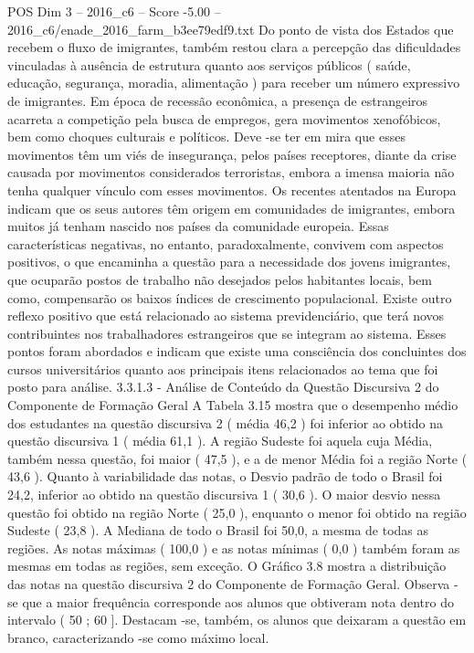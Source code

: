 \begin{textsample}{POS Dim 3 – 2016\_c6 – Score -5.00 – 2016\_c6/enade\_2016\_farm\_b3ee79edf9.txt}
Do ponto de vista dos Estados que recebem o fluxo de imigrantes, também restou clara a percepção das dificuldades vinculadas à ausência de estrutura quanto aos serviços públicos ( saúde, educação, segurança, moradia, alimentação ) para receber um número expressivo de imigrantes.
Em época de recessão econômica, a presença de estrangeiros acarreta a competição pela busca de empregos, gera movimentos xenofóbicos, bem como choques culturais e políticos.
Deve -se ter em mira que esses movimentos têm um viés de insegurança, pelos países receptores, diante da crise causada por movimentos considerados terroristas, embora a imensa maioria não tenha qualquer vínculo com esses movimentos.
Os recentes atentados na Europa indicam que os seus autores têm origem em comunidades de imigrantes, embora muitos já tenham nascido nos países da comunidade europeia.
Essas características negativas, no entanto, paradoxalmente, convivem com aspectos positivos, o que encaminha a questão para a necessidade dos jovens imigrantes, que ocuparão postos de trabalho não desejados pelos habitantes locais, bem como, compensarão os baixos índices de crescimento populacional.
Existe outro reflexo positivo que está relacionado ao sistema previdenciário, que terá novos contribuintes nos trabalhadores estrangeiros que se integram ao sistema.
Esses pontos foram abordados e indicam que existe uma consciência dos concluintes dos cursos universitários quanto aos principais itens relacionados ao tema que foi posto para análise. 3.3.1.3 - Análise de Conteúdo da Questão Discursiva 2 do Componente de Formação Geral A Tabela 3.15 mostra que o desempenho médio dos estudantes na questão discursiva 2 ( média 46,2 ) foi inferior ao obtido na questão discursiva 1 ( média 61,1 ).
A região Sudeste foi aquela cuja Média, também nessa questão, foi maior ( 47,5 ), e a de menor Média foi a região Norte ( 43,6 ).
Quanto à variabilidade das notas, o Desvio padrão de todo o Brasil foi 24,2, inferior ao obtido na questão discursiva 1 ( 30,6 ).
O maior desvio nessa questão foi obtido na região Norte ( 25,0 ), enquanto o menor foi obtido na região Sudeste ( 23,8 ).
A Mediana de todo o Brasil foi 50,0, a mesma de todas as regiões.
As notas máximas ( 100,0 ) e as notas mínimas ( 0,0 ) também foram as mesmas em todas as regiões, sem exceção.
O Gráfico 3.8 mostra a distribuição das notas na questão discursiva 2 do Componente de Formação Geral.
Observa -se que a maior frequência corresponde aos alunos que obtiveram nota dentro do intervalo ( 50 ; 60 ].
Destacam -se, também, os alunos que deixaram a questão em branco, caracterizando -se como máximo local.

\end{textsample}
